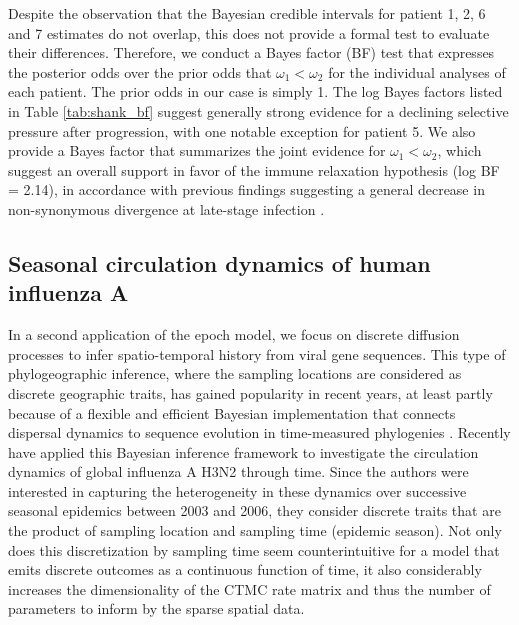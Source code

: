 Despite the observation that the Bayesian credible intervals for patient 1, 2, 6 and 7 estimates do not overlap, this does not provide a formal test to evaluate their differences.
Therefore, we conduct a Bayes factor (BF) test \citep{Suchard2005} that expresses the posterior odds over the prior odds that $\omega_{1} < \omega_{2}$ for the individual analyses of each patient.
The prior odds in our case is simply 1.
The log Bayes factors listed in Table \ref{tab:shank_bf} suggest generally strong evidence for a declining selective pressure after progression, with one notable exception for patient 5.
We also provide a Bayes factor that summarizes the joint evidence for $\omega_{1} < \omega_{2}$, which suggest an overall support in favor of the immune relaxation hypothesis (log BF = 2.14), in accordance with previous findings suggesting a general decrease in non-synonymous divergence at late-stage infection \citep{williamson2005, Lemey2007}.

\subsection{Seasonal circulation dynamics of human influenza A}

In a second application of the epoch model, we focus on discrete diffusion processes to infer spatio-temporal history from viral gene sequences.
This type of phylogeographic inference, where the sampling locations are considered as discrete geographic traits, has gained popularity in recent years, at least partly because of a flexible and efficient Bayesian implementation that connects dispersal dynamics to sequence evolution in time-measured phylogenies \citep{Lemey2009}.
Recently \citet{Bahl2011} have applied this Bayesian inference framework to investigate the circulation dynamics of global influenza A H3N2 through time.
Since the authors were interested in capturing the heterogeneity in these dynamics over successive seasonal epidemics between 2003 and 2006, they consider discrete traits that are the product of sampling location and sampling time (epidemic season).
Not only does this discretization by sampling time seem counterintuitive for a model that emits discrete outcomes as a continuous function of time, it also considerably increases the dimensionality of the CTMC rate matrix and thus the number of parameters to inform by the sparse spatial data.

